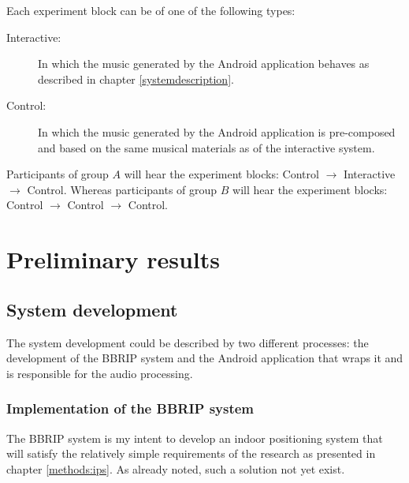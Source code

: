 \documentclass[a4paper,11pt]{article}
\begin{document}
Each experiment block can be of one of the following types:
\begin{description}
	\item[Interactive:] In which the music generated by the Android application behaves as described in chapter \ref{systemdescription}.
	\item[Control:] In which the music generated by the Android application is pre-composed and based on the same musical materials as of the interactive system.
\end{description}

Participants of group $A$ will hear the experiment blocks: Control $\rightarrow$ Interactive $\rightarrow$ Control. Whereas participants of group $B$ will hear the experiment blocks: Control $\rightarrow$ Control $\rightarrow$ Control.

\section{Preliminary results}

\subsection{System development}

The system development could be described by two different processes: the development of the BBRIP system and the Android application that wraps it and is responsible for the audio processing.

\subsubsection{Implementation of the BBRIP system}

The BBRIP system is my intent to develop an indoor positioning system that will satisfy the relatively simple requirements of the research as presented in chapter \ref{methods:ips}.
As already noted, such a solution not yet exist.
\end{document}
